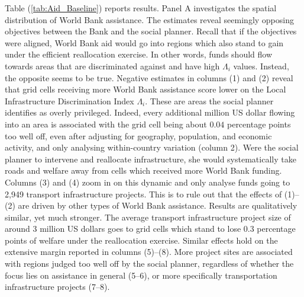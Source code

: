 \documentclass[11pt, oneside]{article}   	%
\let\oldref\ref
\renewcommand{\ref}[1]{(\oldref{#1})}
\begin{document}
Table \ref{tab:Aid_Baseline} reports results. Panel A investigates the spatial distribution of World Bank assistance. The estimates reveal seemingly opposing objectives between the Bank and the social planner. Recall that if the objectives were aligned, World Bank aid would go into regions which also stand to gain under the efficient reallocation exercise. In other words, funds should flow towards areas that are discriminated against and have high $\Lambda_{i}$ values. Instead, the opposite seems to be true. Negative estimates in columns (1) and (2) reveal that grid cells receiving more World Bank assistance score lower on the Local Infrastructure Discrimination Index $\Lambda_{i}$. These are areas the social planner identifies as overly privileged. Indeed, every additional million US dollar flowing into an area is associated with the grid cell being about $0.04$ percentage points too well off, even after adjusting for geography, population, and economic activity, and only analysing within-country variation (column 2). Were the social planner to intervene and reallocate infrastructure, she would systematically take roads and welfare away from cells which received more World Bank funding. Columns (3) and (4) zoom in on this dynamic and only analyse funds going to 2,949 transport infrastructure projects. This is to rule out that the effects of (1)--(2) are driven by other types of World Bank assistance. Results are qualitatively similar, yet much stronger. The average transport infrastructure project size of around 3 million US dollars goes to grid cells which stand to lose $0.3$ percentage points of welfare under the reallocation exercise. Similar effects hold on the extensive margin reported in columns (5)--(8). More project sites are associated with regions judged too well off by the social planner, regardless of whether the focus lies on assistance in general (5--6), or more specifically transportation infrastructure projects (7--8).
\end{document}
